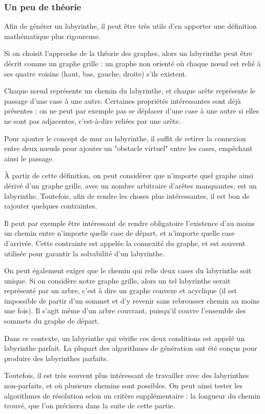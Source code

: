 \documentclass[12pt]{scrreprt} %
\begin{document}
\subsubsection{Un peu de théorie}

Afin de générer un labyrinthe, il peut être très utile d'en apporter une définition mathématique plus rigoureuse.

Si on choisit l'approche de la théorie des graphes, alors un labyrinthe peut être décrit comme un graphe grille : un graphe non orienté où chaque nœud est relié à ses quatre voisins (haut, bas, gauche, droite) s'ils existent.

Chaque nœud représente un chemin du labyrinthe, et chaque arête représente le passage d'une case à une autre. Certaines propriétés intéressantes sont déjà présentes : on ne peut par exemple pas se déplacer d'une case à une autre si elles ne sont pas adjacentes, c'est-à-dire reliées par une arête.

Pour ajouter le concept de mur au labyrinthe, il suffit de retirer la connexion entre deux nœuds pour ajouter un "obstacle virtuel" entre les cases, empêchant ainsi le passage.

À partir de cette définition, on peut considérer que n'importe quel graphe ainsi dérivé d'un graphe grille, avec un nombre arbitraire d'arêtes manquantes, est un labyrinthe. Toutefois, afin de rendre les choses plus intéressantes, il est bon de rajouter quelques contraintes.

Il peut par exemple être intéressant de rendre obligatoire l'existence d'au moins un chemin entre n'importe quelle case de départ, et n'importe quelle case d'arrivée. Cette contrainte est appelée la connexité du graphe, et est souvent utilisée pour garantir la solvabilité d'un labyrinthe.

On peut également exiger que le chemin qui relie deux cases du labyrinthe soit unique. Si on considère notre graphe grille, alors un tel labyrinthe serait représenté par un arbre, c'est à dire un graphe convexe et acyclique (il est impossible de partir d'un sommet et d'y revenir sans rebrousser chemin au moins une fois). Il s'agit même d'un arbre couvrant, puisqu'il couvre l'ensemble des sommets du graphe de départ.

Dans ce contexte, un labyrinthe qui vérifie ces deux conditions est appelé un labyrinthe parfait. La plupart des algorithmes de génération ont été conçus pour produire des labyrinthes parfaits.

Toutefois, il est très souvent plus intéressant de travailler avec des labyrinthes non-parfaits, et où plusieurs chemins sont possibles. On peut ainsi tester les algorithmes de résolution selon un critère supplémentaire : la longueur du chemin trouvé, que l'on précisera dans la suite de cette partie.
\end{document}
